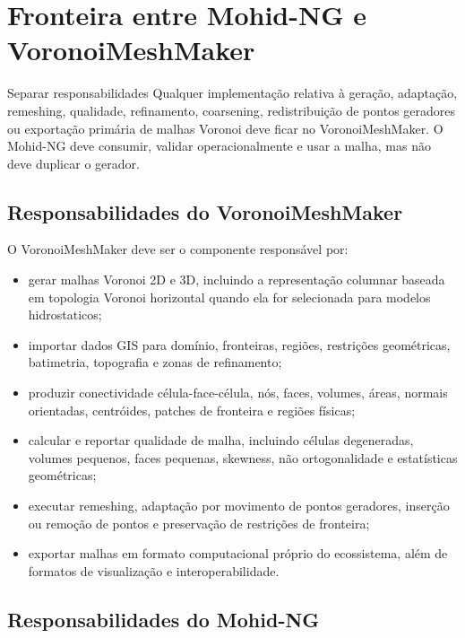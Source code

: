 \documentclass[11pt,a4paper]{article}
\begin{document}
\section{Fronteira entre Mohid-NG e VoronoiMeshMaker}

\begin{decisionbox}{Separar responsabilidades}
Qualquer implementa\c{c}\~ao relativa \`a gera\c{c}\~ao, adapta\c{c}\~ao, remeshing, qualidade, refinamento, coarsening, redistribui\c{c}\~ao de pontos geradores ou exporta\c{c}\~ao prim\'aria de malhas Voronoi deve ficar no VoronoiMeshMaker. O Mohid-NG deve consumir, validar operacionalmente e usar a malha, mas n\~ao deve duplicar o gerador.
\end{decisionbox}

\subsection{Responsabilidades do VoronoiMeshMaker}

O VoronoiMeshMaker deve ser o componente respons\'avel por:
\begin{itemize}
  \item gerar malhas Voronoi 2D e 3D, incluindo a representa\c{c}\~ao columnar baseada em topologia Voronoi horizontal quando ela for selecionada para modelos hidrostaticos;
  \item importar dados GIS para dom\'inio, fronteiras, regi\~oes, restri\c{c}\~oes geom\'etricas, batimetria, topografia e zonas de refinamento;
  \item produzir conectividade c\'elula-face-c\'elula, n\'os, faces, volumes, \'{a}reas, normais orientadas, centr\'oides, patches de fronteira e regi\~oes f\'isicas;
  \item calcular e reportar qualidade de malha, incluindo c\'elulas degeneradas, volumes pequenos, faces pequenas, skewness, n\~ao ortogonalidade e estat\'isticas geom\'etricas;
  \item executar remeshing, adapta\c{c}\~ao por movimento de pontos geradores, inser\c{c}\~ao ou remo\c{c}\~ao de pontos e preserva\c{c}\~ao de restri\c{c}\~oes de fronteira;
  \item exportar malhas em formato computacional pr\'oprio do ecossistema, al\'em de formatos de visualiza\c{c}\~ao e interoperabilidade.
\end{itemize}

\subsection{Responsabilidades do Mohid-NG}
\end{document}
